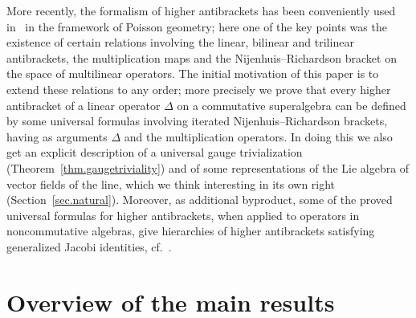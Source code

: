 \documentclass[pdftex]{sigma}
\numberwithin{equation}{section}
\begin{document}
More recently, the formalism of higher antibrackets has been conveniently used in~\cite{FMpoisson} in the framework of Poisson geometry; here one of the key points was the existence of certain relations involving the linear, bilinear and trilinear antibrackets, the multiplication maps and the Nijenhuis--Richardson bracket on the space of multilinear operators. The initial motivation of this paper is to extend these relations to any order; more precisely we prove that every higher antibracket of a linear operator $\Delta$ on a commutative superalgebra can be def\/ined by some universal formulas involving iterated Nijenhuis--Richardson brackets, having as arguments $\Delta$ and the multiplication operators. In doing this we also get an explicit description of a universal gauge trivialization (Theorem~\ref{thm.gaugetriviality}) and of some representations of the Lie algebra of vector f\/ields of the line, which we think interesting in its own right (Section~\ref{sec.natural}). Moreover, as additional byproduct, some of the proved universal formulas for higher antibrackets,
when applied to operators in noncommutative algebras, give hierarchies of higher antibrackets satisfying generalized Jacobi identities, cf.~\cite{intrinsic}.

\section{Overview of the main results}\label{sec.overview}
\end{document}
